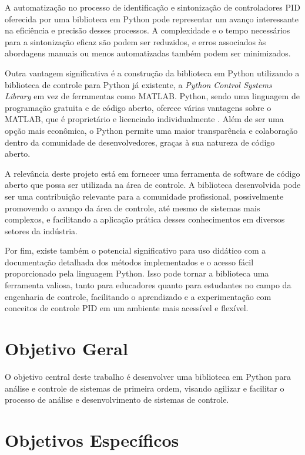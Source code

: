 A automatização no processo de identificação e sintonização de controladores PID oferecida por uma biblioteca em Python
pode representar um avanço interessante na eficiência e precisão desses processos.
A complexidade e o tempo necessários para a sintonização eficaz são podem ser reduzidos, e erros
associados às abordagens manuais ou menos automatizadas também podem ser minimizados.

Outra vantagem significativa é a construção da biblioteca em Python utilizando a biblioteca de
controle para Python já existente, a \textit{Python Control Systems Library} em vez de ferramentas como MATLAB.
Python, sendo uma linguagem de programação gratuita e de código aberto, oferece várias vantagens sobre o MATLAB, que é
proprietário e licenciado individualmente \cite{introart3}.
Além de ser uma opção mais econômica, o Python permite uma maior transparência e colaboração dentro da comunidade de
desenvolvedores, graças à sua natureza de código aberto.

A relevância deste projeto está em fornecer uma ferramenta de software de código aberto que possa ser utilizada na área
de controle.
A biblioteca desenvolvida pode ser uma contribuição relevante para a comunidade profissional, possivelmente promovendo
o avanço da área de controle, até mesmo de sistemas mais complexos, e facilitando a aplicação prática desses
conhecimentos em diversos setores da indústria.

Por fim, existe também o potencial significativo para uso didático com a documentação detalhada dos métodos
implementados e o acesso fácil proporcionado pela linguagem Python.
Isso pode tornar a biblioteca uma ferramenta valiosa, tanto para educadores quanto para estudantes no campo da
engenharia de controle, facilitando o aprendizado e a experimentação com conceitos de controle PID em um ambiente mais
acessível e flexível.

\section{Objetivo Geral}\label{sec:objg}

O objetivo central deste trabalho é desenvolver uma biblioteca em Python para análise
e controle de sistemas de primeira ordem, visando agilizar e facilitar o processo de
análise e desenvolvimento de sistemas de controle.

\section{Objetivos Específicos}\label{sec:objs}

